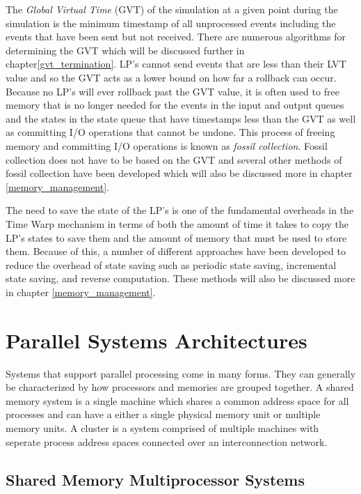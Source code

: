 \documentclass[11pt]{book}
\begin{document}
The \emph{Global Virtual Time} (GVT) of the simulation at a given point during the simulation
is the minimum timestamp of all unprocessed events including the events that have been
sent but not received\cite{jefferson-85}.  There are numerous algorithms for determining
the GVT which will be discussed further in chapter\ref{gvt_termination}.  LP's cannot send
events that are less than their LVT value and so the GVT acts as a lower bound on how far
a rollback can occur.  Because no LP's will ever rollback past the GVT value, it is often
used to free memory that is no longer needed for the events in the input and output queues
and the states in the state queue that have timestamps less than the GVT as well as committing
I/O operations that cannot be undone.  This process of freeing memory and committing I/O
operations is known as \emph{fossil collection}.  Fossil collection does not have to be based
on the GVT and several other methods of fossil collection have been developed which will
also be discussed more in chapter \ref{memory_management}.

The need to save the state of the LP's is one of the fundamental overheads in the Time Warp
mechanism in terms of both the amount of time it takes to copy the LP's states to save them
and the amount of memory that must be used to store them.  Because of this, a number of
different approaches have been developed to reduce the overhead of state saving such as
periodic state saving, incremental state saving, and reverse computation.  These methods
will also be discussed more in chapter \ref{memory_management}.

\section{Parallel Systems Architectures}

Systems that support parallel processing come in many forms.  They can generally be characterized
by how processors and memories are grouped together.  A shared memory system is a single machine
which shares a common address space for all processes and can have a either a single physical
memory unit or multiple memory units.  A cluster is a system comprised of multiple machines with
seperate process address spaces connected over an interconnection network.

\subsection{Shared Memory Multiprocessor Systems}
\end{document}
